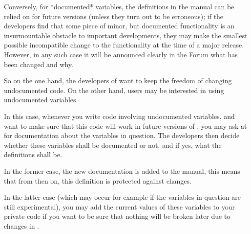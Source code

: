Conversely, for *documented* variables, the definitions in the {\GAP}
manual can be relied on for future {\GAP} versions (unless they turn out
to be erroneous);
if the {\GAP} developers find that some piece of minor, but documented
functionality is an insurmountable obstacle to important developments,
they may make the smallest possible incompatible change to the functionality
at the time of a major release.
However, in any such case it will be announced clearly in the {\GAP} Forum
what has been changed and why.

So on the one hand, the developers of {\GAP} want to keep the freedom
of changing undocumented {\GAP} code.
On the other hand, users may be interested in using undocumented
variables.

In this case, whenever you write {\GAP} code involving undocumented
variables,
and want to make sure that this code will work in future versions of {\GAP},
you may ask at  for documentation
about the variables in question.
The {\GAP} developers then decide whether these variables shall be
documented or not, and if yes, what the definitions shall be.

In the former case, the new documentation is added to the {\GAP} manual,
this means that from then on, this definition is protected against
changes.

In the latter case (which may occur for example if the variables
in question are still experimental), you may add the current
values of these variables to your private code if you want to
be sure that nothing will be broken later due to changes in {\GAP}.




